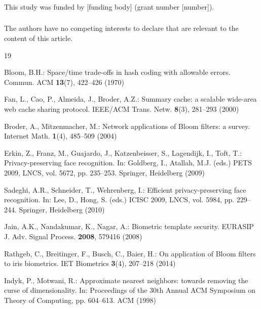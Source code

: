 \documentclass[runningheads]{llncs}
\begin{document}
\begin{credits}
\subsubsection{\ackname} %
This study was funded by [funding body] (grant number [number]).

\subsubsection{\discintname}
The authors have no competing interests to declare that are relevant to the content of this article.
\end{credits}
%
%
\begin{thebibliography}{19}

 Bloom, B.H.: Space/time trade-offs in hash coding with allowable errors.
Commun. ACM \textbf{13}(7), 422--426 (1970)

 Fan, L., Cao, P., Almeida, J., Broder, A.Z.: Summary cache: a scalable wide-area web cache
sharing protocol. IEEE/ACM Trans. Netw. \textbf{8}(3), 281--293 (2000)

 Broder, A., Mitzenmacher, M.: Network applications of Bloom filters: a survey.
Internet Math. \textbf{1}(4), 485--509 (2004)

 Erkin, Z., Franz, M., Guajardo, J., Katzenbeisser, S., Lagendijk, I., Toft, T.:
Privacy-preserving face recognition. In: Goldberg, I., Atallah, M.J. (eds.) PETS 2009, LNCS, vol. 5672,
pp. 235--253. Springer, Heidelberg (2009)

 Sadeghi, A.R., Schneider, T., Wehrenberg, I.: Efficient privacy-preserving face
recognition. In: Lee, D., Hong, S. (eds.) ICISC 2009, LNCS, vol. 5984, pp. 229--244. Springer, Heidelberg (2010)

 Jain, A.K., Nandakumar, K., Nagar, A.: Biometric template security. EURASIP J. Adv.
Signal Process. \textbf{2008}, 579416 (2008)

 Rathgeb, C., Breitinger, F., Busch, C., Baier, H.: On application of Bloom filters to
iris biometrics. IET Biometrics \textbf{3}(4), 207--218 (2014)

 Indyk, P., Motwani, R.: Approximate nearest neighbors: towards removing the curse of
dimensionality. In: Proceedings of the 30th Annual ACM Symposium on Theory of Computing, pp. 604--613.
ACM (1998)


\end{thebibliography}
\end{document}
